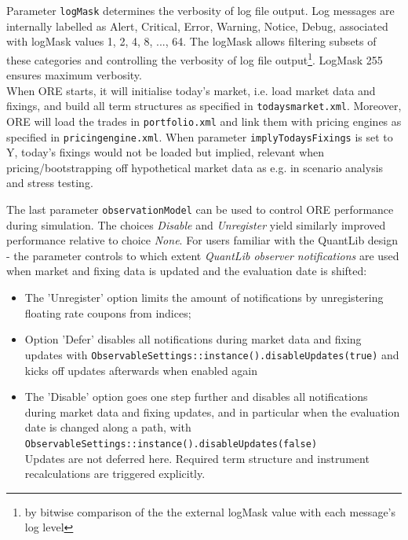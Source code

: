 \documentclass[12pt, a4paper]{article}
\begin{document}
Parameter {\tt logMask} determines the verbosity of log file output. Log messages are 
internally labelled as Alert, Critical, Error, Warning, Notice, Debug, associated with logMask values 1, 2, 4, 8, ..., 64. 
The logMask allows filtering subsets of these categories and controlling the verbosity of log file output\footnote{by bitwise comparison of the the external logMask value with each message's log level}. LogMask 255 ensures maximum verbosity. \\

When ORE starts, it will initialise today's market, i.e. load market data and fixings, and build all term structures as
specified in {\tt todaysmarket.xml}.  Moreover, ORE will load the trades in {\tt portfolio.xml} and link them with
pricing engines as specified in {\tt pricingengine.xml}. When parameter {\tt implyTodaysFixings} is set to Y, today's
fixings would not be loaded but implied, relevant when pricing/bootstrapping off hypothetical market data as e.g. in
scenario analysis and stress testing.

\medskip The last parameter {\tt observationModel} can be used to control ORE performance during simulation. The choices
{\em Disable } and {\em Unregister } yield similarly improved performance relative to choice {\em None}. For users
familiar with the QuantLib design - the parameter controls to which extent {\em QuantLib observer notifications} are
used when market and fixing data is updated and the evaluation date is shifted:
\begin{itemize}
\item The 'Unregister' option limits the amount of notifications by unregistering floating rate coupons from indices;
\item Option 'Defer' disables all notifications during market data and fixing updates with
{\tt ObservableSettings::instance().disableUpdates(true)}
and kicks off updates afterwards when enabled again
\item The 'Disable' option goes one step further and disables all notifications during market data and fixing updates,
  and in particular when the evaluation date is changed along a path, with \\
  {\tt ObservableSettings::instance().disableUpdates(false)} \\
  Updates are not deferred here. Required term structure and instrument recalculations are triggered explicitly.
\end{itemize}
\end{document}
